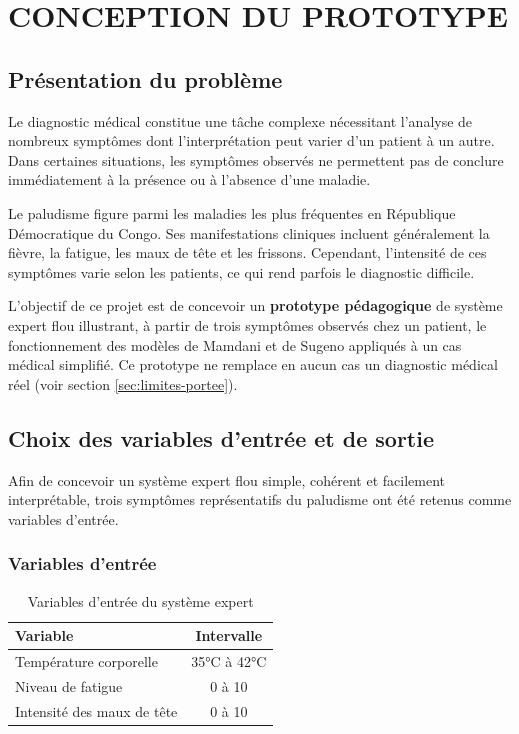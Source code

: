 \documentclass[a4paper,12pt]{report} %
\begin{document}

\newpage
\chapter{CONCEPTION DU PROTOTYPE}

\section{Présentation du problème}

Le diagnostic médical constitue une tâche complexe nécessitant l'analyse de nombreux symptômes dont l'interprétation peut varier d'un patient à un autre. Dans certaines situations, les symptômes observés ne permettent pas de conclure immédiatement à la présence ou à l'absence d'une maladie.

Le paludisme figure parmi les maladies les plus fréquentes en République Démocratique du Congo. Ses manifestations cliniques incluent généralement la fièvre, la fatigue, les maux de tête et les frissons. Cependant, l'intensité de ces symptômes varie selon les patients, ce qui rend parfois le diagnostic difficile.

L'objectif de ce projet est de concevoir un \textbf{prototype pédagogique} de système expert flou illustrant, à partir de trois symptômes observés chez un patient, le fonctionnement des modèles de Mamdani et de Sugeno appliqués à un cas médical simplifié. Ce prototype ne remplace en aucun cas un diagnostic médical réel (voir section \ref{sec:limites-portee}).

\section{Choix des variables d'entrée et de sortie}

Afin de concevoir un système expert flou simple, cohérent et facilement interprétable, trois symptômes représentatifs du paludisme ont été retenus comme variables d'entrée.

\subsection{Variables d'entrée}

\begin{table}[H]
\centering
\caption{Variables d'entrée du système expert}
\begin{tabular}{|l|c|}
\hline
\textbf{Variable} & \textbf{Intervalle} \\
\hline
Température corporelle & 35°C à 42°C \\
Niveau de fatigue & 0 à 10 \\
Intensité des maux de tête & 0 à 10 \\
\hline
\end{tabular}
\end{table}
\end{document}
